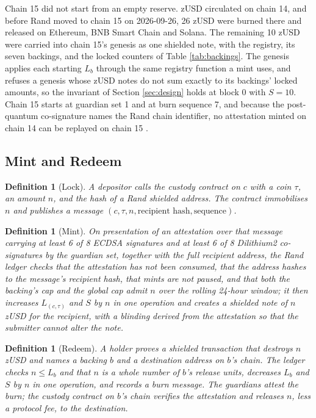 \documentclass[11pt,a4paper]{article}
\newtheorem{definition}[theorem]{Definition}
\begin{document}
Chain 15 did not start from an empty reserve. zUSD circulated on chain 14, and before Rand moved to chain 15 on 2026-09-26, 26 zUSD were burned there and released on Ethereum, BNB Smart Chain and Solana. The remaining 10 zUSD were carried into chain 15's genesis as one shielded note, with the registry, its seven backings, and the locked counters of Table \ref{tab:backings}. The genesis applies each starting $L_b$ through the same registry function a mint uses, and refuses a genesis whose zUSD notes do not sum exactly to its backings' locked amounts, so the invariant of Section \ref{sec:design} holds at block 0 with $S = 10$. Chain 15 starts at guardian set 1 and at burn sequence 7, and because the post-quantum co-signature names the Rand chain identifier, no attestation minted on chain 14 can be replayed on chain 15 \cite{randbridge}.

\subsection{Mint and Redeem}

\begin{definition}[Lock]
A depositor calls the custody contract on $c$ with a coin $\tau$, an amount $n$, and the hash of a Rand shielded address. The contract immobilises $n$ and publishes a message $(c, \tau, n, \text{recipient hash}, \text{sequence})$.
\end{definition}

\begin{definition}[Mint]
On presentation of an attestation over that message carrying at least 6 of 8 ECDSA signatures and at least 6 of 8 Dilithium2 co-signatures by the guardian set, together with the full recipient address, the Rand ledger checks that the attestation has not been consumed, that the address hashes to the message's recipient hash, that mints are not paused, and that both the backing's cap and the global cap admit $n$ over the rolling 24-hour window; it then increases $L_{(c,\tau)}$ and $S$ by $n$ in one operation and creates a shielded note of $n$ zUSD for the recipient, with a blinding derived from the attestation so that the submitter cannot alter the note.
\end{definition}

\begin{definition}[Redeem]
A holder proves a shielded transaction that destroys $n$ zUSD and names a backing $b$ and a destination address on $b$'s chain. The ledger checks $n \leq L_b$ and that $n$ is a whole number of $b$'s release units, decreases $L_b$ and $S$ by $n$ in one operation, and records a burn message. The guardians attest the burn; the custody contract on $b$'s chain verifies the attestation and releases $n$, less a protocol fee, to the destination.
\end{definition}
\end{document}
